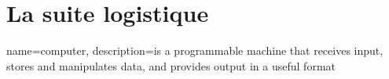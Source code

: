 %
%

\chapter{La suite logistique}
\cite{Perrin}
\cite{Attract}

{
  name=computer,
  description={is a programmable machine that receives input,
               stores and manipulates data, and provides
               output in a useful format}
}
